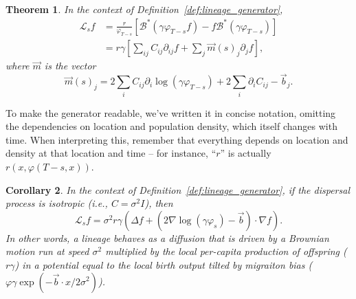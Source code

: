 \documentclass[12pt]{article}
\newtheorem{theorem}{Theorem}[section]
\newtheorem{corollary}[theorem]{Corollary}
\newcommand{\grad}{\nabla}
\newcommand{\DG}{\mathcal{B}}  %
\newcommand{\meanq}{\vec b}    %
\newcommand{\covq}{C}     %
\newcommand{\Lgen}{\mathcal{L}}    %
\begin{document}
\begin{theorem} \label{thm:lineages}
    In the context of Definition~\ref{def:lineage_generator},
    \begin{align}
        \label{eqn:lineage_generator}
        \Lgen_s f
        &=
        \frac{r}{\varphi_{T-s}}
        \left[
            \DG^*(\gamma \varphi_{T-s} f) 
            - f \DG^* (\gamma \varphi_{T-s})
        \right] \\
        &= \label{eqn:lineage_generator2}
        r\gamma
        \left[
            \sum_{ij} \covq_{ij} \partial_{ij} f
            + \sum_j \vec{m}(s)_j \partial_j f
        \right] ,
    \end{align}
    where $\vec{m}$ is the vector
    $$
    \vec{m}(s)_j
    =
    2 \sum_i C_{ij} \partial_i \log(\gamma \varphi_{T-s})
    + 2 \sum_i \partial_i C_{ij}
    - \meanq_j .
    $$
\end{theorem}

To make the generator readable, we've written it in concise notation,
omitting the dependencies on location and population density,
which itself changes with time.
When interpreting this,
remember that everything depends on location and density at that location and time --
for instance, ``$r$'' is actually $r(x, \varphi(T-s, x))$.

\begin{corollary} \label{cor:lineages_simple}
    In the context of Definition~\ref{def:lineage_generator},
    if the dispersal process is isotropic (i.e., $\covq = \sigma^2 I$),
    then
    \begin{equation}
        \Lgen_s f
        =
        \sigma^2 r \gamma
        \left(
            \Delta f
            +
            \left(
                2 \grad \log(\gamma \varphi_s)
                - \meanq
            \right)
            \cdot \grad f
        \right) .
    \end{equation}
    In other words, 
    a lineage behaves as a diffusion
    that is driven by a Brownian motion 
    run at speed $\sigma^2$ multiplied by the local per-capita production of offspring ($r \gamma$)
    in a potential equal to the local birth output tilted by migraiton bias
    ($\varphi \gamma \exp(-\meanq \cdot x / 2 \sigma^2)$).
\end{corollary}
\end{document}
